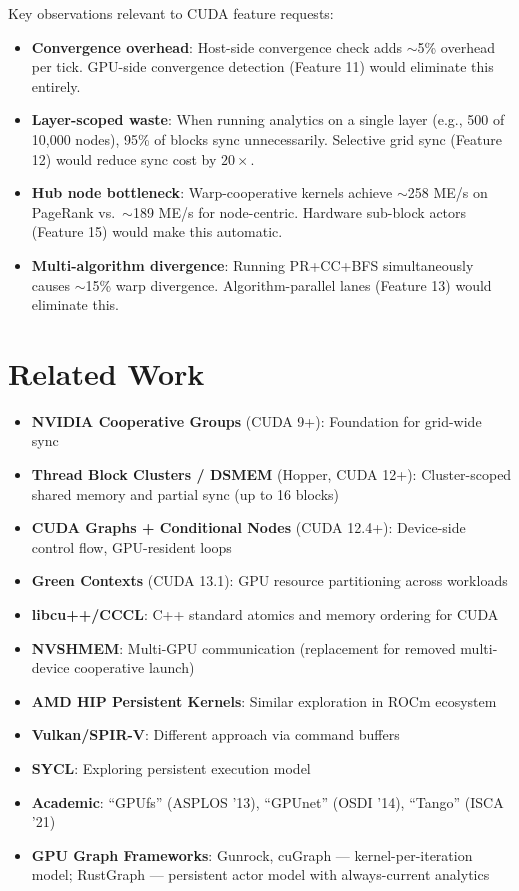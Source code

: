 \documentclass[11pt,a4paper]{article}
\begin{document}
Key observations relevant to CUDA feature requests:
\begin{itemize}[leftmargin=*]
    \item \textbf{Convergence overhead}: Host-side convergence check adds $\sim$5\% overhead per tick. GPU-side convergence detection (Feature 11) would eliminate this entirely.
    \item \textbf{Layer-scoped waste}: When running analytics on a single layer (e.g., 500 of 10,000 nodes), 95\% of blocks sync unnecessarily. Selective grid sync (Feature 12) would reduce sync cost by $20\times$.
    \item \textbf{Hub node bottleneck}: Warp-cooperative kernels achieve $\sim$258 ME/s on PageRank vs.\ $\sim$189 ME/s for node-centric. Hardware sub-block actors (Feature 15) would make this automatic.
    \item \textbf{Multi-algorithm divergence}: Running PR+CC+BFS simultaneously causes $\sim$15\% warp divergence. Algorithm-parallel lanes (Feature 13) would eliminate this.
\end{itemize}

\section{Related Work}

\begin{itemize}[leftmargin=*]
    \item \textbf{NVIDIA Cooperative Groups} (CUDA 9+): Foundation for grid-wide sync
    \item \textbf{Thread Block Clusters / DSMEM} (Hopper, CUDA 12+): Cluster-scoped shared memory and partial sync (up to 16 blocks)
    \item \textbf{CUDA Graphs + Conditional Nodes} (CUDA 12.4+): Device-side control flow, GPU-resident loops
    \item \textbf{Green Contexts} (CUDA 13.1): GPU resource partitioning across workloads
    \item \textbf{libcu++/CCCL}: C++ standard atomics and memory ordering for CUDA
    \item \textbf{NVSHMEM}: Multi-GPU communication (replacement for removed multi-device cooperative launch)
    \item \textbf{AMD HIP Persistent Kernels}: Similar exploration in ROCm ecosystem
    \item \textbf{Vulkan/SPIR-V}: Different approach via command buffers
    \item \textbf{SYCL}: Exploring persistent execution model
    \item \textbf{Academic}: ``GPUfs'' (ASPLOS '13), ``GPUnet'' (OSDI '14), ``Tango'' (ISCA '21)
    \item \textbf{GPU Graph Frameworks}: Gunrock, cuGraph --- kernel-per-iteration model; RustGraph --- persistent actor model with always-current analytics
\end{itemize}
\end{document}
